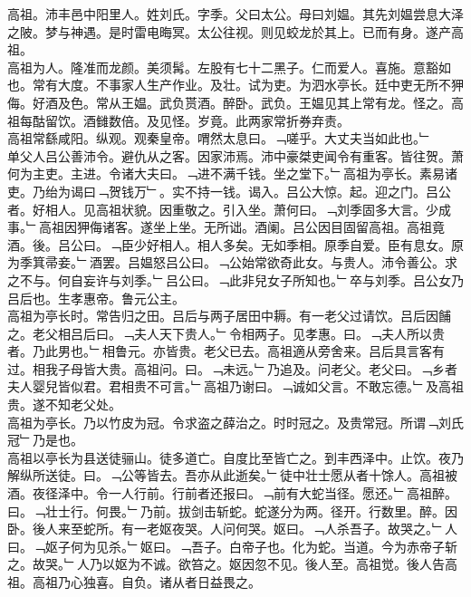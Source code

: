 \documentclass{zhvt-classic}
\begin{document}





\hspace*{2em}高祖。沛丰邑中阳里人。姓刘氏。字季。父曰太公。母曰刘媪。其先刘媪尝息大泽之陂。梦与神遇。是时雷电晦冥。太公往视。则见蛟龙於其上。已而有身。遂产高祖。\\
\hspace*{2em}高祖为人。隆准而龙颜。美须髯。左股有七十二黑子。仁而爱人。喜施。意豁如也。常有大度。不事家人生产作业。及壮。试为吏。为泗水亭长。廷中吏无所不狎侮。好酒及色。常从王媪。武负贳酒。醉卧。武负。王媪见其上常有龙。怪之。高祖每酤留饮。酒雠数倍。及见怪。岁竟。此两家常折券弃责。\\
\hspace*{2em}高祖常繇咸阳。纵观。观秦皇帝。喟然太息曰。﹁嗟乎。大丈夫当如此也。﹂\\
\hspace*{2em}单父人吕公善沛令。避仇从之客。因家沛焉。沛中豪桀吏闻令有重客。皆往贺。萧何为主吏。主进。令诸大夫曰。﹁进不满千钱。坐之堂下。﹂高祖为亭长。素易诸吏。乃绐为谒曰﹁贺钱万﹂。实不持一钱。谒入。吕公大惊。起。迎之门。吕公者。好相人。见高祖状貌。因重敬之。引入坐。萧何曰。﹁刘季固多大言。少成事。﹂高祖因狎侮诸客。遂坐上坐。无所诎。酒阑。吕公因目固留高祖。高祖竟酒。後。吕公曰。﹁臣少好相人。相人多矣。无如季相。原季自爱。臣有息女。原为季箕帚妾。﹂酒罢。吕媪怒吕公曰。﹁公始常欲奇此女。与贵人。沛令善公。求之不与。何自妄许与刘季。﹂吕公曰。﹁此非兒女子所知也。﹂卒与刘季。吕公女乃吕后也。生孝惠帝。鲁元公主。\\
\hspace*{2em}高祖为亭长时。常告归之田。吕后与两子居田中耨。有一老父过请饮。吕后因餔之。老父相吕后曰。﹁夫人天下贵人。﹂令相两子。见孝惠。曰。﹁夫人所以贵者。乃此男也。﹂相鲁元。亦皆贵。老父已去。高祖適从旁舍来。吕后具言客有过。相我子母皆大贵。高祖问。曰。﹁未远。﹂乃追及。问老父。老父曰。﹁乡者夫人婴兒皆似君。君相贵不可言。﹂高祖乃谢曰。﹁诚如父言。不敢忘德。﹂及高祖贵。遂不知老父处。\\
\hspace*{2em}高祖为亭长。乃以竹皮为冠。令求盗之薛治之。时时冠之。及贵常冠。所谓﹁刘氏冠﹂乃是也。\\
\hspace*{2em}高祖以亭长为县送徒骊山。徒多道亡。自度比至皆亡之。到丰西泽中。止饮。夜乃解纵所送徒。曰。﹁公等皆去。吾亦从此逝矣。﹂徒中壮士愿从者十馀人。高祖被酒。夜径泽中。令一人行前。行前者还报曰。﹁前有大蛇当径。愿还。﹂高祖醉。曰。﹁壮士行。何畏。﹂乃前。拔剑击斩蛇。蛇遂分为两。径开。行数里。醉。因卧。後人来至蛇所。有一老妪夜哭。人问何哭。妪曰。﹁人杀吾子。故哭之。﹂人曰。﹁妪子何为见杀。﹂妪曰。﹁吾子。白帝子也。化为蛇。当道。今为赤帝子斩之。故哭。﹂人乃以妪为不诚。欲笞之。妪因忽不见。後人至。高祖觉。後人告高祖。高祖乃心独喜。自负。诸从者日益畏之。\\
\end{document}
